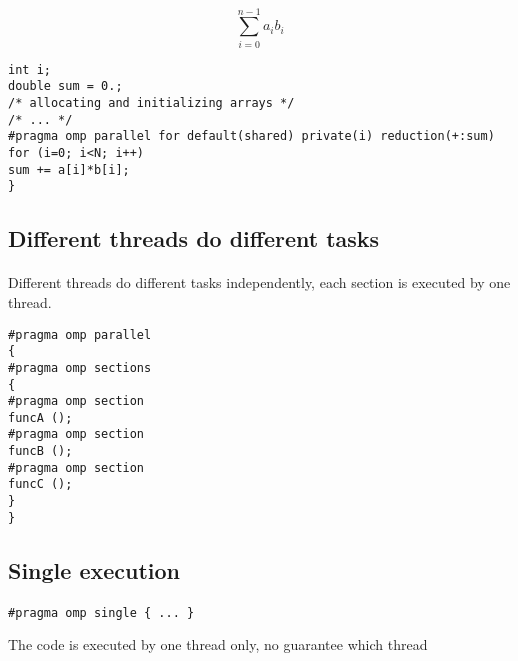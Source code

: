 \documentclass[%
oneside,                 %
final,                   %
10pt]{article}
\begin{document}
\paragraph{}
\[
\sum_{i=0}^{n-1} a_ib_i
\]
\begin{verbatim}
int i;
double sum = 0.;
/* allocating and initializing arrays */
/* ... */
#pragma omp parallel for default(shared) private(i) reduction(+:sum)
for (i=0; i<N; i++)
sum += a[i]*b[i];
}
\end{verbatim}



\subsection*{Different threads do different tasks}

\paragraph{}

Different threads do different tasks independently, each section is executed by one thread.
\begin{verbatim}
#pragma omp parallel
{
#pragma omp sections
{
#pragma omp section
funcA ();
#pragma omp section
funcB ();
#pragma omp section
funcC ();
}
}
\end{verbatim}



\subsection*{Single execution}

\paragraph{}
\begin{verbatim}
#pragma omp single { ... }
\end{verbatim}
The code is executed by one thread only, no guarantee which thread
\end{document}
